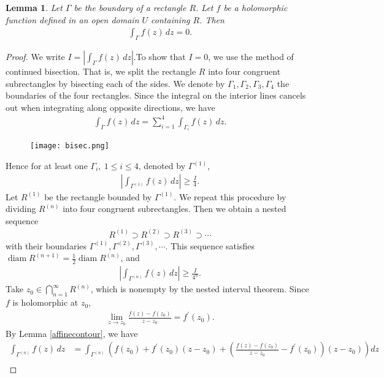 \documentclass{article}
\numberwithin{equation}{section}
\DeclareMathOperator{\diam}{diam}
\theoremstyle{plain}
\newtheorem{lemma}[theorem]{Lemma}
\theoremstyle{definition}
\begin{document}
\begin{lemma}\label{recintegral}
Let $\Gamma$ be the boundary of a rectangle $R$. Let $f$ be a holomorphic function defined in an open domain $U$ containing $R$. Then
\begin{align*}
	\int_\Gamma f(z)\,dz=0.
\end{align*}
\end{lemma}
\begin{proof}
We write $I=\left\vert\int_\Gamma f(z)\,dz\right\vert$.To show that $I = 0$, we use the method of continued bisection. That is, we split the rectangle $R$ into four congruent subrectangles by bisecting each of the sides. We denote by $\Gamma_1,\Gamma_2,\Gamma_3,\Gamma_4$ the boundaries of the four rectangles. Since the integral on the interior lines cancels out when integrating along opposite directions, we have
\begin{align*}
\int_\Gamma f(z)\,dz=\sum_{i=1}^4\int_{\Gamma_i}f(z)\,dz.
\end{align*}
\begin{figure}[H]
\centering
\texttt{[image: bisec.png]}
\end{figure}
Hence for at least one $\Gamma_i,\ 1\leq i\leq 4$, denoted by $\Gamma^{(1)}$,
\begin{align*}
	\left\vert\int_{\Gamma^{(1)}}f(z)\,dz\right\vert\geq\frac{I}{4}.
\end{align*}
Let $R^{(1)}$ be the rectangle bounded by $\Gamma^{(1)}$. We repeat this procedure by dividing $R^{(n)}$ into four congruent subrectangles. Then we obtain a nested sequence
\begin{align*}
	R^{(1)}\supset R^{(2)}\supset R^{(3)}\supset\cdots
\end{align*}
with their boundaries $\Gamma^{(1)},\Gamma^{(2)},\Gamma^{(3)},\cdots$. This sequence satisfies $\diam R^{(n+1)}=\frac{1}{2}\diam R^{(n)}$, and
\begin{align}
	\left\vert\int_{\Gamma^{(n)}}f(z)\,dz\right\vert\geq\frac{I}{4^n}.\label{recintest1}
\end{align}
Take $z_0\in\bigcap_{n=1}^\infty R^{(n)}$, which is nonempty by the nested interval theorem. Since $f$ is holomorphic at $z_0$,
\begin{align*}
	\lim_{z\to z_0}\frac{f(z)-f(z_0)}{z-z_0}=f^\prime(z_0).
\end{align*}
By Lemma \ref{affinecontour}, we have
\begin{align*}
	\int_{\Gamma^{(n)}}f(z)\,dz&=\int_{\Gamma^{(n)}}\left(f(z_0)+f^\prime(z_0)(z-z_0)+\left(\frac{f(z)-f(z_0)}{z-z_0}-f^\prime(z_0)\right)(z-z_0)\right)dz\\

\end{align*}
\end{proof}
\end{document}
